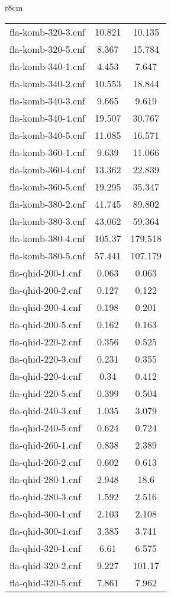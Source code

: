 \begin{wraptable}[29]{r}{8cm}
\begin{tabular}{l| c c }
fla-komb-320-3.cnf & 10.821 & 10.135 \\
fla-komb-320-5.cnf & 8.367 & 15.784 \\
fla-komb-340-1.cnf & 4.453 & 7.647 \\
fla-komb-340-2.cnf & 10.553 & 18.844 \\
fla-komb-340-3.cnf & 9.665 & 9.619 \\
fla-komb-340-4.cnf & 19.507 & 30.767 \\
fla-komb-340-5.cnf & 11.085 & 16.571 \\
fla-komb-360-1.cnf & 9.639 & 11.066 \\
fla-komb-360-4.cnf & 13.362 & 22.839 \\
fla-komb-360-5.cnf & 19.295 & 35.347 \\
fla-komb-380-2.cnf & 41.745 & 89.802 \\
fla-komb-380-3.cnf & 43.062 & 59.364 \\
fla-komb-380-4.cnf & 105.37 & 179.518 \\
fla-komb-380-5.cnf & 57.441 & 107.179 \\
fla-qhid-200-1.cnf & 0.063 & 0.063 \\
fla-qhid-200-2.cnf & 0.127 & 0.122 \\
fla-qhid-200-4.cnf & 0.198 & 0.201 \\
fla-qhid-200-5.cnf & 0.162 & 0.163 \\
fla-qhid-220-2.cnf & 0.356 & 0.525 \\
fla-qhid-220-3.cnf & 0.231 & 0.355 \\
fla-qhid-220-4.cnf & 0.34 & 0.412 \\
fla-qhid-220-5.cnf & 0.399 & 0.504 \\
fla-qhid-240-3.cnf & 1.035 & 3.079 \\
fla-qhid-240-5.cnf & 0.624 & 0.724 \\
fla-qhid-260-1.cnf & 0.838 & 2.389 \\
fla-qhid-260-2.cnf & 0.602 & 0.613 \\
fla-qhid-280-1.cnf & 2.948 & 18.6 \\
fla-qhid-280-3.cnf & 1.592 & 2.516 \\
fla-qhid-300-1.cnf & 2.103 & 2.108 \\
fla-qhid-300-4.cnf & 3.385 & 3.741 \\
\fi
fla-qhid-320-1.cnf & 6.61 & 6.575 \\
fla-qhid-320-2.cnf & 9.227 & 101.17 \\
fla-qhid-320-5.cnf & 7.861 & 7.962 \\

\end{tabular}
\end{wraptable}

